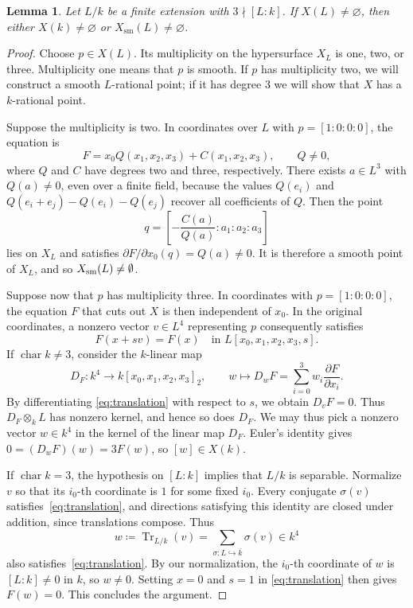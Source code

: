 \documentclass[a4paper,11pt]{amsart}
\numberwithin{equation}{section}
\newtheorem{lemma}[theorem]{Lemma}
\theoremstyle{definition}
\theoremstyle{remark}
\DeclareMathOperator{\Tr}{Tr}
\newcommand{\bk}{\overline{k}}
\begin{document}
\begin{lemma}\label{lem:singular-point}
Let $L/k$ be a finite extension with $3\nmid[L:k]$. If
$X(L)\ne\varnothing$, then either $X(k)\ne\varnothing$ or
$X_{\mathrm{sm}}(L)\ne\varnothing$.
\end{lemma}
\begin{proof}
Choose $p\in X(L)$. Its multiplicity on the hypersurface $X_L$ is
one, two, or three. Multiplicity one means that $p$ is smooth. 
If $p$ has multiplicity two, we will construct a smooth $L$-rational point;
if it has degree $3$ we will show that $X$ has a $k$-rational point.

Suppose the multiplicity is two. In coordinates over $L$ with
$p=[1:0:0:0]$, the equation is
\[
 F=x_0Q(x_1,x_2,x_3)+C(x_1,x_2,x_3),
 \qquad Q\ne0,
\]
where $Q$ and $C$ have degrees two and three, respectively. There exists
$a\in L^3$ with $Q(a)\ne0$, even over a finite field, because the values
$Q(e_i)$ and $Q(e_i+e_j)-Q(e_i)-Q(e_j)$ recover all coefficients of
$Q$.  
Then the point
\[
 q=\left[-\frac{C(a)}{Q(a)}:a_1:a_2:a_3\right]
\]
lies on $X_L$ and satisfies $\partial F/\partial x_0(q)=Q(a)\ne0$.
It is therefore a smooth point of $X_L$,  and so $X_{\rm sm}(L)\neq \emptyset$. 

Suppose now that $p$ has multiplicity three. 
In coordinates with $p=[1:0:0:0]$, the equation $F$ 
that cuts out $X$ is then independent of $x_0$. In the original
coordinates, a nonzero vector $v\in L^4$ representing $p$ consequently
satisfies
\begin{equation}\label{eq:translation}
 F(x+s v)=F(x)
 \quad\text{in }L[x_0,x_1,x_2,x_3,s].
\end{equation}
If $\operatorname{char}k\ne3$, consider the $k$-linear map
\[
 D_F \colon k^4\longrightarrow k[x_0,x_1,x_2,x_3]_2,
 \qquad w\longmapsto D_wF=\sum_{i=0}^3w_i\frac{\partial F}{\partial x_i}.
\]
By differentiating \eqref{eq:translation} with respect to $s$,
we obtain $D_vF=0$. Thus $D_F\otimes_k L$ has nonzero kernel,
and hence so does $D_F$.
We may thus pick a nonzero vector $w\in k^4$ in the kernel of 
the linear map $D_F$. Euler's identity gives
$0=(D_wF)(w)=3F(w)$, so $[w]\in X(k)$.

If $\operatorname{char}k=3$, the hypothesis on $[L:k]$ implies that
$L/k$ is separable. Normalize $v$ so that 
its $i_0$-th coordinate is $1$ for some fixed $i_0$. 
Every conjugate $\sigma(v)$ satisfies~\eqref{eq:translation}, and
directions satisfying this identity are closed under addition, since
translations compose. Thus
\[
 w\coloneq \Tr_{L/k}(v)=\sum_{\sigma:L\hookrightarrow\bk}\sigma(v)\in k^4
\]
also satisfies~\eqref{eq:translation}. 
By our normalization, the $i_0$-th coordinate of $w$ is
$[L:k]\ne0$ in $k$, so $w\ne0$.
Setting $x=0$ and $s=1$ in \eqref{eq:translation} then gives
$F(w)=0$. This concludes the argument. 
\end{proof}
\end{document}
